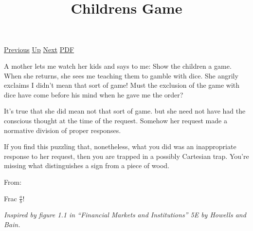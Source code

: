 \documentclass[12pt,a4paper]{report}
\begin{document}
 \href{doc/phil/PhilSituations/BeeWaggle.html}{Previous} 
 \href{doc/phil/PhilSituations.html}{Up} 
 \href{doc/phil/PhilSituations/ClassicalBehaviorism.html}{Next} 
 \href{doc/phil/PhilSituations/ChildrensGame.pdf}{PDF} 
\title{Childrens Game}

A mother lets me watch her kids and says to me: Show the children a game. When she returns, she sees me teaching them to gamble with
dice. She angrily exclaims I didn't mean that sort of game! Must the exclusion
of the game with dice have come before his mind when he gave me the order?

It's true that she did mean not that sort of game. but she need not have had the conscious thought at the time of the request. Somehow her request made a normative division of proper responses.

If you find this puzzling that, nonetheless, what you did was an inappropriate response to her request, then you are trapped in a possibly Cartesian trap. You're missing what distinguishes a sign from a piece of wood.

From: \cite{wittgenstein2010philosophical}

Frac $\frac{a}{b}$!




   \vspace{1em}
   \emph{Inspired by figure 1.1 in ``Financial Markets and Institutions'' 5E
     by Howells and Bain.}





\end{document}
